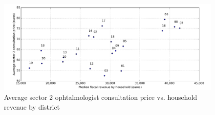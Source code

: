 \documentclass[11pt]{article}
\begin{document}
\begin{figure}[H]
    \caption{Average sector 2 ophtalmologist consultation price vs. household revenue by district}
	\centering
		\includegraphics[width=16cm]{images/Ophtalmo_Ardt_ConsultationS2VsRevenue.png}
\end{figure}

\clearpage

\appendix
\end{document}
